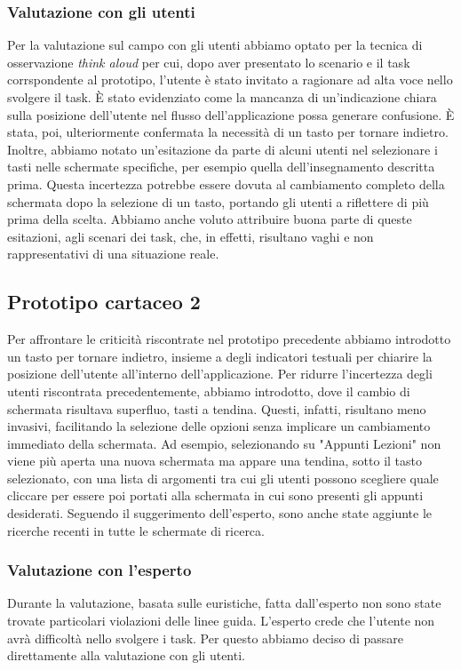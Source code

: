 \subsubsection{Valutazione con gli utenti}
Per la valutazione sul campo con gli utenti abbiamo optato per la tecnica di osservazione \textit{think aloud} per cui, dopo aver presentato lo scenario
e il task corrspondente al prototipo, l'utente è stato invitato a ragionare ad alta voce nello svolgere il task. È stato evidenziato come la mancanza
di un'indicazione chiara sulla posizione dell'utente nel flusso dell'applicazione possa generare confusione. È stata, poi, ulteriormente confermata la necessità di
un tasto per tornare indietro.
Inoltre, abbiamo notato un'esitazione da parte di alcuni utenti nel selezionare i tasti nelle schermate specifiche, per esempio quella dell'insegnamento descritta
prima. Questa incertezza potrebbe essere dovuta al cambiamento completo della schermata dopo la selezione di un tasto, portando gli utenti a riflettere di più prima della scelta.
Abbiamo anche voluto attribuire buona parte di queste esitazioni, agli scenari dei task, che, in effetti, risultano vaghi e non rappresentativi di una situazione reale.


\subsection{Prototipo cartaceo 2}
Per affrontare le criticità riscontrate nel prototipo precedente abbiamo introdotto un tasto per tornare indietro, insieme a degli indicatori testuali per chiarire
la posizione dell'utente all'interno dell'applicazione.
Per ridurre l'incertezza degli utenti riscontrata precedentemente, abbiamo introdotto, dove il cambio di schermata risultava superfluo, tasti a tendina. Questi,
infatti, risultano meno invasivi, facilitando la selezione delle opzioni senza implicare un cambiamento immediato della schermata. Ad esempio, selezionando su
"Appunti Lezioni" non viene più aperta una nuova schermata ma appare una tendina, sotto il tasto selezionato, con una lista di argomenti tra cui gli utenti possono
scegliere quale cliccare per essere poi portati alla schermata in cui sono presenti gli appunti desiderati.
Seguendo il suggerimento dell'esperto, sono anche state aggiunte le ricerche recenti in tutte le schermate di ricerca.


\subsubsection{Valutazione con l'esperto}
Durante la valutazione, basata sulle euristiche, fatta dall’esperto non sono state trovate particolari violazioni delle linee guida. L’esperto crede che l’utente non avrà difficoltà nello svolgere i task.
Per questo abbiamo deciso di passare direttamente alla valutazione con gli utenti.


